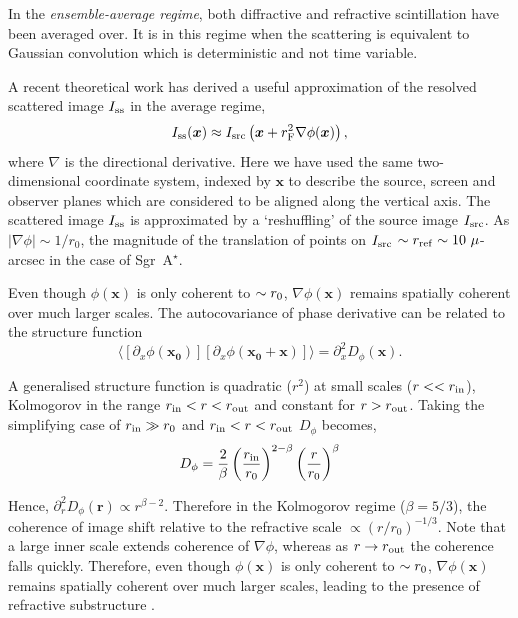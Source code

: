 In the \emph{ensemble-average regime}, both diffractive and refractive scintillation have been averaged over. It is in this regime when  the scattering is equivalent to Gaussian convolution which is deterministic and not time variable. 


A recent theoretical work \citep*{Johnson_2015a} has derived a useful approximation of the resolved scattered image $I_{\rm ss}$ in the average regime,
\begin{equation}\label{eq:scatterbrane}
I_{\rm ss}(\boldsymbol{x}) \approx I_{\rm src}\left(\boldsymbol{x} + r_{\rm F}^2 \nabla \phi(\boldsymbol{x})\right),
\end{equation}
where $\nabla$ is the directional derivative. Here we have used the same two-dimensional coordinate system, indexed by $\bm{x}$ to describe the source, screen and observer planes which are considered to be aligned along the vertical axis. The scattered image $I_{\rm ss}$ is approximated by a `reshuffling' of the source image $I_{\rm src}$. As $|\nabla\phi| \sim 1/r_0$, the magnitude of the translation of points on $I_{\rm src}$ $\sim r_{\rm ref} \sim 10\ \mu$-arcsec in the case of Sgr~A$^\star$. 

Even though $\phi(\bm{x})$ is only coherent to $\sim r_{\rm 0}$, $\nabla \phi(\bm{x})$ remains spatially coherent over much larger scales. The autocovariance of phase derivative can be related to the structure function \citep*{Johnson_2015a}
\begin{equation} 
\langle [ \partial_x \phi(\bm{x_0})] [ \partial_x \phi(\bm{x_0}+\bm{x})] \rangle = \partial_x^2 D_\phi(\bm{x}).
\end{equation}


A generalised structure function \citep{Tatarskii_1971, Narayan_1989} is quadratic ($r^2$) at small scales ($r<< r_{\rm in}$), Kolmogorov in the range $r_{\rm in}<r<r_{\rm out}$ and constant for $r>r_{\rm out}$. Taking the simplifying case of $r_{\rm in} \gg r_0$ and $r_{\rm in}<r<r_{\rm out}$ $D_\phi$ becomes\citep{johnson_dissertation},
\begin{equation}
D_\phi = \frac{2}{\beta}\left( \frac{r_{\rm in}}{r_0}\right)^{2-\beta} \left( \frac{r}{r_0}\right)^\beta 
\end{equation}

Hence, $\partial_r^2 D_\phi(\bm{r}) \propto r^{\beta-2}$. Therefore in the Kolmogorov regime ($\beta = 5/3$), the coherence of image shift relative to the refractive scale $\propto (r/r_0)^{-1/3}$. Note that a large inner scale extends coherence of $\nabla\phi$, whereas as $r \to r_{\rm out}$ the coherence falls quickly. Therefore, even though $\phi(\bm{x})$ is only coherent to $\sim r_{\rm 0}$, $\nabla \phi(\bm{x})$ remains spatially coherent over much larger scales, leading to the presence of refractive substructure \citep*{Johnson_2015a}. 

